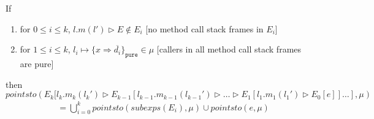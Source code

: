 \documentclass{llncs}
\newcommand{\keywadj}[1]{\mathtt{#1}}
\newcommand{\intuition}[1]{#1}
\begin{document}
\newpage
\begin{mdframed}
\begin{lemma}
\label{l:pt-all-pure}
If
\begin{enumerate}
\item for $0 \leq i \leq k$, $l.m(l') \rhd E \not\in E_i$ \intuition{\hspace{150pt} [no method call stack frames in $E_i$]}
\item for $1 \leq i \leq k$, $l_i \mapsto \{ x \Rightarrow \overline{d_i} \}_{\keywadj{pure}} \in \mu$ \intuition{\hspace{70pt} [callers in all method call stack frames are pure]}
\end{enumerate}
then
\noindent$pointsto(E_k[l_k.m_k(l_k') \rhd E_{k-1}[l_{k-1}.m_{k-1}(l_{k-1}') \rhd \dots \rhd E_1[l_1.m_1(l_1') \rhd E_0[e]] \dots ], \mu)$
\vspace{-7pt}
\begin{align*}
&= \bigcup^k_{i = 0} pointsto(subexps(E_i), \mu) \cup pointsto(e, \mu)
\end{align*}
\end{lemma}
\end{mdframed}
\end{document}
